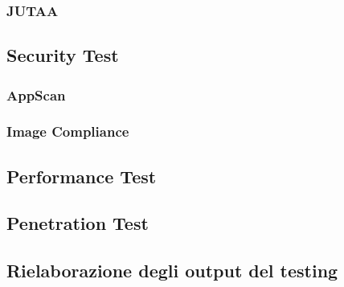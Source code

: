 \subsubsection{JUTAA}
\subsection{Security Test}
\subsubsection{AppScan}
\subsubsection{Image Compliance}
\subsection{Performance Test}
\subsection{Penetration Test}
\subsection{Rielaborazione degli output del testing}

